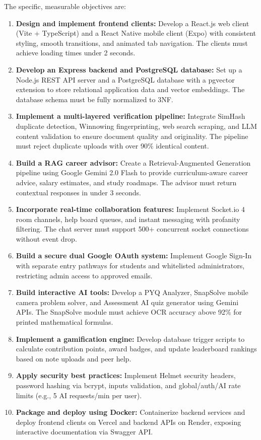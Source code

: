 \documentclass[12,Times new Roman,a4paper]{report}
\begin{document}
The specific, measurable objectives are:
\begin{enumerate}
    \item \textbf{Design and implement frontend clients:} Develop a React.js web client (Vite + TypeScript) and a React Native mobile client (Expo) with consistent styling, smooth transitions, and animated tab navigation. The clients must achieve loading times under 2 seconds.
    \item \textbf{Develop an Express backend and PostgreSQL database:} Set up a Node.js REST API server and a PostgreSQL database with a pgvector extension to store relational application data and vector embeddings. The database schema must be fully normalized to 3NF.
    \item \textbf{Implement a multi-layered verification pipeline:} Integrate SimHash duplicate detection, Winnowing fingerprinting, web search scraping, and LLM content validation to ensure document quality and originality. The pipeline must reject duplicate uploads with over 90\% identical content.
    \item \textbf{Build a RAG career advisor:} Create a Retrieval-Augmented Generation pipeline using Google Gemini 2.0 Flash to provide curriculum-aware career advice, salary estimates, and study roadmaps. The advisor must return contextual responses in under 3 seconds.
    \item \textbf{Incorporate real-time collaboration features:} Implement Socket.io 4 room channels, help board queues, and instant messaging with profanity filtering. The chat server must support 500+ concurrent socket connections without event drop.
    \item \textbf{Build a secure dual Google OAuth system:} Implement Google Sign-In with separate entry pathways for students and whitelisted administrators, restricting admin access to approved emails.
    \item \textbf{Build interactive AI tools:} Develop a PYQ Analyzer, SnapSolve mobile camera problem solver, and Assessment AI quiz generator using Gemini APIs. The SnapSolve module must achieve OCR accuracy above 92\% for printed mathematical formulas.
    \item \textbf{Implement a gamification engine:} Develop database trigger scripts to calculate contribution points, award badges, and update leaderboard rankings based on note uploads and peer help.
    \item \textbf{Apply security best practices:} Implement Helmet security headers, password hashing via bcrypt, inputs validation, and global/auth/AI rate limits (e.g., 5 AI requests/min per user).
    \item \textbf{Package and deploy using Docker:} Containerize backend services and deploy frontend clients on Vercel and backend APIs on Render, exposing interactive documentation via Swagger API.
\end{enumerate}
\end{document}
